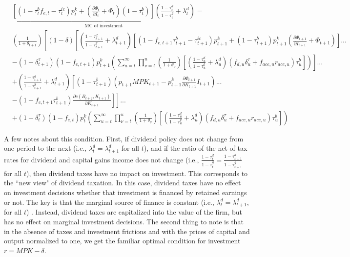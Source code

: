 \begin{equation}
\begin{split}
&\underbrace{ \left[(1-\tau^{b}_{t}f_{e,t}-\tau^{ic}_{t})p^{k}_{t} + \left(\frac{\partial \Phi_{t}}{\partial I_{t}} + \Phi_{t}\right)(1-\tau^{b}_{t})\right]\left(\frac{1-\tau^{d}_{t}}{1-\tau^{g}_{t}} + \lambda^{d}_{t}\right)}_{\text{MC of investment}} = \\
& \left(\frac{1}{1+\theta_{t+1}}\right)\left[(1-\delta)\left[\left(\frac{1-\tau^{d}_{t+1}}{1-\tau^{g}_{t+1}} + \lambda^{d}_{t+1}\right)\left[(1-f_{e,t+1}\tau^{b}_{t+1}-\tau^{ic}_{t+1})p^{k}_{t+1}+ (1-\tau^{b}_{t+1})p^{k}_{t+1}\left(\frac{\partial \Phi_{t+1}}{\partial I_{t+1}} + \Phi_{t+1}\right)\right]...\right.\right. \\
& \left.\left.  -  (1-\delta^{\tau}_{t+1})(1-f_{e,t+1})p^{k}_{t+1}\left(\sum_{u=t}^{\infty} \prod_{\nu=t}^{u}\left(\frac{1}{1+\theta_{\nu}}\right)\left[\left(\frac{1-\tau^{d}_{u}}{1-\tau^{g}_{u}}+\lambda^{d}_{u}\right)\left( f_{d,u}\delta^{\tau}_{u}+f_{ace,u}r_{ace,u} \right)\tau^{b}_{u}\right]\right)\right]... \right. \\
& \left. +  \left(\frac{1-\tau^{d}_{t+1}}{1-\tau^{g}_{t+1}} + \lambda^{d}_{t+1} \right)\left[(1-\tau^{b}_{t+1})\left(p_{t+1}MPK_{t+1}- p^{k}_{t+1}\frac{\partial \Phi_{t+1}}{\partial K_{t+1}}I_{t+1}\right)  ... \right.\right. \\
& \left.\left.-(1-f_{c,t+1}\tau^{b}_{t+1}) \frac{\partial c(B_{t+2},K_{t+1})}{\partial K_{t+1}} \right] \right] ...\\
&  + (1-\delta^{\tau}_{t})(1-f_{e,t})p^{k}_{t}\left(\sum_{u=t}^{\infty} \prod_{\nu=t}^{u}\left(\frac{1}{1+\theta_{\nu}}\right)\left[\left(\frac{1-\tau^{d}_{u}}{1-\tau^{g}_{u}}+\lambda^{d}_{u}\right)\left( f_{d,u}\delta^{\tau}_{u}+f_{ace,u}r_{ace,u} \right)\tau^{b}_{u}\right]\right)
\end{split}
\end{equation}

A few notes about this condition.  First, if dividend policy does not change from one period to the next (i.e., $\lambda^{d}_{t}=\lambda^{d}_{t+1}$ for all $t$), and if the ratio of the net of tax rates for dividend and capital gains income does not change (i.e., $\frac{1-\tau^{d}_{t}}{1-\tau^{g}_{t}}=\frac{1-\tau^{d}_{t+1}}{1-\tau^{g}_{t+1}}$ for all $t$), then dividend taxes have no impact on investment.  This corresponds to the ``new view" of dividend taxation.  In this case, dividend taxes have no effect on investment decisions whether that investment is financed by retained earnings or not.  The key is that the marginal source of finance is constant (i.e., $\lambda^{d}_{t}=\lambda^{d}_{t+1}$, for all $t$) .  Instead, dividend taxes are capitalized into the value of the firm, but has no effect on marginal investment decisions.  The second thing to note is that in the absence of taxes and investment frictions and with the prices of capital and output normalized to one, we get the familiar optimal condition for investment  $r=MPK-\delta$.

